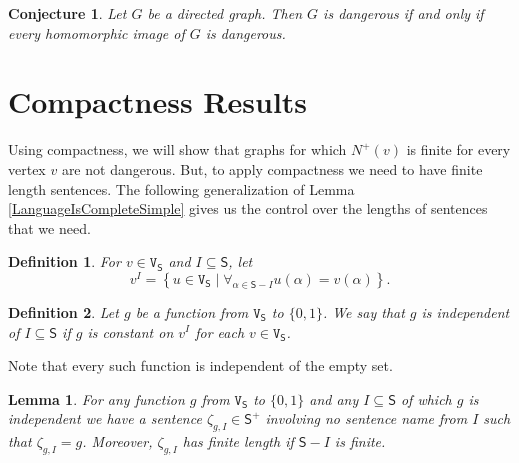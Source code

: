 \documentclass[12pt]{article}
\newtheorem{lem}[thm]{Lemma}
\newtheorem{conj}[thm]{Conjecture}
\newtheorem{defn}{Definition}
\theoremstyle{remark}
\def\S{\textsf{S}}
\def\V{\texttt{V}}
\begin{document}
\begin{conj}
Let $G$ be a directed graph.  Then $G$ is dangerous if and only if every homomorphic image of $G$ is dangerous.
\end{conj}

\section{Compactness Results}
\label{sec6}

Using compactness, we will show that graphs for which $N^+(v)$ is finite for every vertex $v$ are not dangerous. But, to apply compactness we need to have finite length sentences. The following generalization of Lemma \ref{LanguageIsCompleteSimple} gives us the control over the lengths of sentences that we need.

\begin{defn}
For $v \in \V_\S$ and $I \subseteq \S$, let
\[v^I = \left\{u \in  \V_\S \mid \forall_{\alpha \in \S - I} u(\alpha) = v(\alpha)\right\}.\]
\end{defn}

\begin{defn}
Let $g$ be a function from $\V_\S$ to $\{0, 1\}$.  We say that $g$ is \emph{independent of} $I \subseteq \S$ if $g$ is constant on $v^I$ for each $v \in \V_\S$.
\end{defn}

Note that every such function is independent of the empty set.

\begin{lem}\label{LanguageIsComplete}
For any function $g$ from $\V_\S$ to $\{0, 1\}$ and any $I \subseteq \S$ of which $g$ is independent we have a sentence $\zeta_{g, I} \in \S^+$ involving no sentence name from $I$ such that $\zeta_{g, I} = g$. Moreover, $\zeta_{g, I}$ has finite length if $\S - I$ is finite.
\end{lem}
\end{document}
